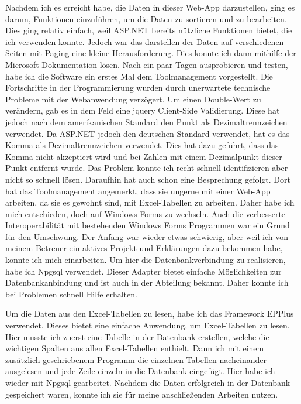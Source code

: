 \documentclass{Vorlage}
\begin{document}
Nachdem ich es erreicht habe, die Daten in dieser Web-App darzustellen, ging es darum, Funktionen
einzuführen, um die Daten zu sortieren und zu bearbeiten. Dies ging relativ einfach, weil ASP.NET bereits
nützliche Funktionen bietet, die ich verwenden konnte. Jedoch war das darstellen der Daten auf 
verschiedenen Seiten mit Paging eine kleine Herausforderung. Dies konnte ich dann mithilfe der
Microsoft-Dokumentation lösen. Nach ein paar Tagen ausprobieren und testen, habe ich die Software
ein erstes Mal dem Toolmanagement vorgestellt. Die Fortschritte in der Programmierung
 wurden durch unerwartete technische Probleme mit der Webanwendung verzögert.
Um einen Double-Wert zu verändern, gab es in dem Feld eine jquery Client-Side Validierung. Diese hat jedoch 
nach dem amerikanischen Standard den Punkt als Dezimaltrennzeichen verwendet. Da ASP.NET jedoch den deutschen
Standard verwendet, hat es das Komma als Dezimaltrennzeichen verwendet. Dies hat dazu geführt, dass das
Komma nicht akzeptiert wird und bei Zahlen mit einem Dezimalpunkt dieser Punkt entfernt wurde. Das Problem
konnte ich recht schnell identifizieren aber nicht so schnell lösen. Daraufhin hat auch schon eine Besprechung
gefolgt. Dort hat das Toolmanagement angemerkt, dass sie ungerne mit einer
Web-App arbeiten, da sie es gewohnt sind, mit Excel-Tabellen zu arbeiten. Daher habe ich mich entschieden,
doch auf Windows Forms zu wechseln. Auch die verbesserte Interoperabilität mit bestehenden Windows Forms 
Programmen war ein Grund für den Umschwung. Der Anfang war wieder etwas schwierig, aber weil ich von meinem 
Betreuer ein aktives Projekt und Erklärungen dazu bekommen habe, konnte ich mich einarbeiten.
Um hier die Datenbankverbindung zu realisieren, habe ich Npgsql verwendet.
Dieser Adapter bietet einfache Möglichkeiten
zur Datenbankanbindung und ist auch in der Abteilung bekannt. Daher konnte ich bei Problemen
schnell Hilfe erhalten.

Um die Daten aus den Excel-Tabellen zu lesen, habe ich das Framework EPPlus verwendet. Dieses bietet
eine einfache Anwendung, um Excel-Tabellen zu lesen. Hier musste ich zuerst eine Tabelle in der Datenbank
erstellen, welche die wichtigen Spalten aus allen Excel-Tabellen enthielt. Dann ich mit einem zusätzlich 
geschriebenem Programm die einzelnen Tabellen nacheinander ausgelesen und jede Zeile einzeln in die Datenbank
eingefügt. Hier habe ich wieder mit Npgsql gearbeitet. Nachdem die Daten erfolgreich in der Datenbank 
gespeichert waren, konnte ich sie für meine anschließenden Arbeiten nutzen.
\end{document}
